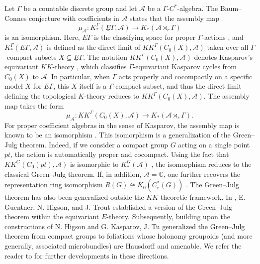 \documentclass[pdflatex]{sn-jnl}
\theoremstyle{plain}
\theoremstyle{definition}
\begin{document}
Let $\Gamma$ be a countable discrete group and let $\mathcal{A}$ be a $\Gamma$-$C^{*}$-algebra. The Baum--Connes conjecture with coefficients in $\mathcal{A}$ states that the assembly map
\[\mu_{\mathcal{A}}:K_{*}^\Gamma(\underline{E}\Gamma,\mathcal{A})\longrightarrow K_{*}(\mathcal{A}\rtimes_r\Gamma)\]
is an isomorphism.
Here, $\underline{E}\Gamma$ is the classifying space for proper $\Gamma$-actions \cite{BCH94}, and $K_{*}^\Gamma(\underline{E}\Gamma,\mathcal{A})$ is defined as the direct limit of $KK^\Gamma(C_0(X),\mathcal{A})$ taken over all $\Gamma$-compact subsets $X\subseteq\underline{E}\Gamma$.
The notation $KK^\Gamma(C_0(X),\mathcal{A})$ denotes Kasparov's equivariant $KK$-theory \cite{Kas88}, which classifies $\Gamma$-equivariant Kasparov cycles from $C_{0}(X)$ to $\mathcal{A}$. 
In particular, when $\Gamma$ acts properly and cocompactly on a specific model $X$ for $\underline{E}\Gamma$, this $X$ itself is a $\Gamma$-compact subset, and thus the direct limit defining the topological $K$-theory reduces to $KK^\Gamma(C_0(X),\mathcal{A})$. The assembly map takes the form 
$$\mu_{\mathcal{A}}: KK^\Gamma(C_0(X),\mathcal{A})\longrightarrow K_{*}(\mathcal{A}\rtimes_r\Gamma).$$ 
For proper coefficient algebras in the sense of Kasparov, the assembly map is known to be an isomorphism \cite{Kas88,GHT00,HigsonKasparov2001}. This isomorphism is a generalization of the Green--Julg theorem.
Indeed, if we consider a compact group $G$ acting on a single point $pt$, the action is automatically proper and cocompact. Using the fact that $KK^G(C_0(pt),\mathcal{A})$ is isomorphic to $K_{*}^{G}(\mathcal{A})$ \cite{Bla98}, the isomorphism reduces to the classical Green--Julg theorem. If, in addition, $\mathcal{A}=\mathbb{C}$, one further recovers the representation ring isomorphism $R(G)\cong K_{0}(C^{*}_{r}(G))$ \cite{Atiyah69,Seg68}.
The Green--Julg theorem has also been generalized outside the $KK$-theoretic framework. 
In \cite{GHT00}, E. Guentner, N. Higson, and J. Trout established a version of the Green--Julg theorem within the equivariant $E$-theory. Subsequently, building upon the constructions of N. Higson and G. Kasparov, J. Tu \cite{Tu99} generalized the Green--Julg theorem from compact groups to foliations whose holonomy groupoids (and more generally, associated microbundles) are Hausdorff and amenable. We refer the reader to \cite{Par13, Tu04, HG04, CELY17} for further developments in these directions.
\end{document}
